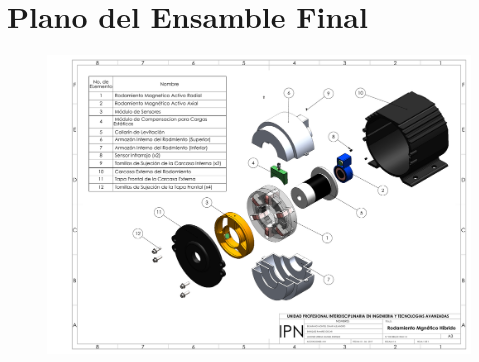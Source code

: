 \chapter{Plano del Ensamble Final}

\newpage

\begin{figure}[t]
\centering
	\includegraphics[width=\textheight, height=\textwidth, angle=270]{images/Apendices/Plano_Ensamble}
\end{figure}